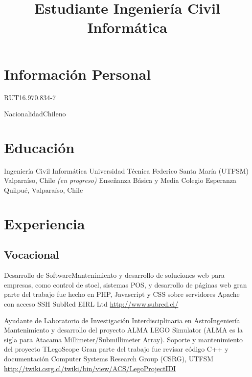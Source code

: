 \documentclass[11pt,a4paper]{moderncv}
\title{Estudiante Ingeniería Civil Informática}
\begin{document}
\maketitle

\section{Información Personal}

	   {RUT}{16.970.834-7}

	   {Nacionalidad}{Chileno}
	   
\section{Educación}

        {Ingeniería Civil Informática}
        {Universidad Técnica Federico Santa María (UTFSM)}
        {Valparaíso, Chile}
        {\emph{(en progreso)}}
        {}
        {Enseñanza Básica y Media}
        {Colegio Esperanza}
        {Quilpué, Valparaíso, Chile}
        {}{}

\section{Experiencia}
\subsection{Vocacional}
        
        {Desarrollo de Software}{Mantenimiento y desarrollo de soluciones web para empresas, como control de stocl, sistemas POS, y desarrollo de páginas web}
        {gran parte del trabajo fue hecho en PHP, Javascript y CSS sobre servidores Apache con acceso SSH}
        {SubRed EIRL Ltd}
        {\url{http://www.subred.cl/}}

		{Ayudante de Laboratorio de Investigación Interdisciplinaria en AstroIngeniería}
		{Mantenimiento y desarrollo del proyecto ALMA LEGO Simulator (ALMA es la sigla para \href{http://www.alma.cl/}{Atacama Millimeter/Submillimeter Array}). Soporte y mantenimiento del proyecto TLegoScope}
		{Gran parte del trabajo fue revisar código C++ y documentación}
        {Computer Systems Research Group (CSRG), UTFSM}
        {\url{http://twiki.csrg.cl/twiki/bin/view/ACS/LegoProjectIDI}}
\end{document}
